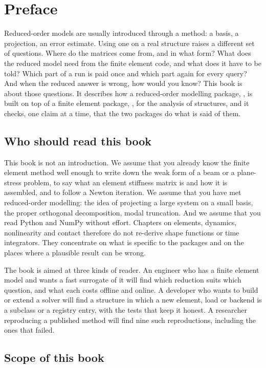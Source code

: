 \chapter*{Preface}

Reduced-order models are usually introduced through a method: a basis, a projection, an error estimate. Using one on a real structure raises a different set of questions. Where do the matrices come from, and in what form? What does the reduced model need from the finite element code, and what does it have to be told? Which part of a run is paid once and which part again for every query? And when the reduced answer is wrong, how would you know? This book is about those questions. It describes how a reduced-order modelling package, \rom{}, is built on top of a finite element package, \fea{}, for the analysis of structures, and it checks, one claim at a time, that the two packages do what is said of them.

\section*{Who should read this book}

This book is not an introduction. We assume that you already know the finite element method well enough to write down the weak form of a beam or a plane-stress problem, to say what an element stiffness matrix is and how it is assembled, and to follow a Newton iteration. We assume that you have met reduced-order modelling: the idea of projecting a large system on a small basis, the proper orthogonal decomposition, modal truncation. And we assume that you read Python and NumPy without effort. Chapters on elements, dynamics, nonlinearity and contact therefore do not re-derive shape functions or time integrators. They concentrate on what is specific to the packages and on the places where a plausible result can be wrong.

The book is aimed at three kinds of reader. An engineer who has a finite element model and wants a fast surrogate of it will find which reduction suits which question, and what each costs offline and online. A developer who wants to build or extend a solver will find a structure in which a new element, load or backend is a subclass or a registry entry, with the tests that keep it honest. A researcher reproducing a published method will find nine such reproductions, including the ones that failed.

\section*{Scope of this book}

